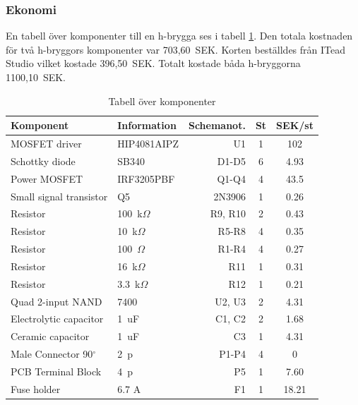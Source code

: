 \subsubsection{Ekonomi}
En tabell över komponenter till en h-brygga ses i tabell \ref{tbl:BOM h-brygga}.
Den totala kostnaden för två h-bryggors komponenter var 703,60~SEK. Korten
beställdes från ITead Studio vilket kostade 396,50~SEK. Totalt kostade
båda h-bryggorna 1100,10~SEK.

\begin{table}[htbp!]
\centering
\caption{Tabell över komponenter}
\label{tbl:BOM h-brygga}
\begin{tabular}{|l|l|r|c|c|}
\hline
\textbf{Komponent} & \textbf{Information} &
\textbf{Schemanot.} & \textbf{St} & \textbf{SEK/st} \\
\hline
MOSFET driver & HIP4081AIPZ & U1 & 1 & 102 \\
\hline
Schottky diode & SB340 & D1-D5 & 6 & 4.93\\
\hline
Power MOSFET & IRF3205PBF & Q1-Q4 & 4 & 43.5\\
\hline
Small signal transistor & Q5 & 2N3906 & 1 & 0.26\\
\hline
Resistor & 100~k$\Omega$ & R9, R10 & 2 & 0.43\\
\hline
Resistor & 10~k$\Omega$ & R5-R8 & 4 & 0.35\\
\hline
Resistor & 100~$\Omega$ & R1-R4 & 4 & 0.27\\
\hline
Resistor & 16~k$\Omega$ & R11 & 1 & 0.31\\
\hline
Resistor & 3.3~k$\Omega$ & R12 & 1 & 0.21\\
\hline
Quad 2-input NAND & 7400 & U2, U3 & 2 & 4.31\\
\hline
Electrolytic capacitor & 1~uF & C1, C2 & 2 & 1.68\\
\hline
Ceramic capacitor & 1~uF & C3 & 1 & 4.31\\
\hline
Male Connector 90$^{\circ}$ & 2~p & P1-P4 & 4 & 0\\
\hline
PCB Terminal Block &  4~p & P5 & 1 & 7.60\\
\hline
Fuse holder & 6.7 A & F1 & 1 & 18.21\\
\hline
\end{tabular}	
\end{table}